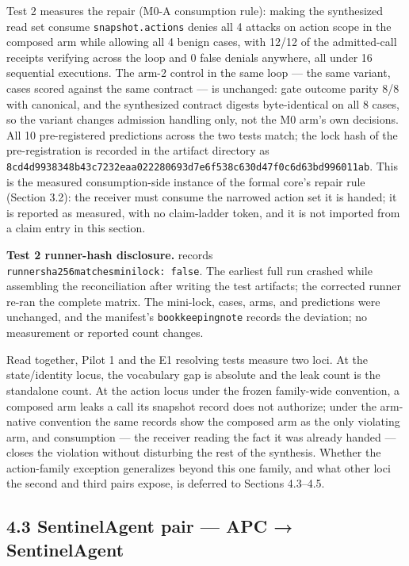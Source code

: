 \documentclass[
  10pt,
]{article}
\let\origtexttt\texttt
\renewcommand{\texttt}[1]{{\upshape\origtexttt{#1}}}
\renewcommand{\_}{\origunderscore\allowbreak}
\begin{document}
Test 2 measures the repair (M0-A consumption rule): making the
synthesized read set consume \texttt{snapshot.actions} denies all 4
attacks on action scope in the composed arm while allowing all 4 benign
cases, with 12/12 of the admitted-call receipts verifying across the
loop and 0 false denials anywhere, all under 16 sequential executions.
The arm-2 control in the same loop --- the same variant, cases scored
against the same contract --- is unchanged: gate outcome parity 8/8 with
canonical, and the synthesized contract digests byte-identical on all 8
cases, so the variant changes admission handling only, not the M0 arm's
own decisions. All 10 pre-registered predictions across the two tests
match; the lock hash of the pre-registration is recorded in the artifact
directory as
\texttt{8cd4d9938348b43c7232eaa022280693d7e6f538c630d47f0c6d63bd996011ab}.
This is the measured consumption-side instance of the formal core's
repair rule (Section 3.2): the receiver must consume the narrowed action
set it is handed; it is reported as measured, with no claim-ladder
token, and it is not imported from a claim entry in this section.

\textbf{Test 2 runner-hash disclosure.}
 records
\texttt{runner\_sha256\_matches\_mini\_lock:\ false}. The earliest full
run crashed while assembling the reconciliation after writing the test
artifacts; the corrected runner re-ran the complete matrix. The
mini-lock, cases, arms, and predictions were unchanged, and the
manifest's \texttt{bookkeeping\_note} records the deviation; no
measurement or reported count changes.

Read together, Pilot 1 and the E1 resolving tests measure two loci. At
the state/identity locus, the vocabulary gap is absolute and the leak
count is the standalone count. At the action locus under the frozen
family-wide convention, a composed arm leaks a call its snapshot record
does not authorize; under the arm-native convention the same records
show the composed arm as the only violating arm, and consumption --- the
receiver reading the fact it was already handed --- closes the violation
without disturbing the rest of the synthesis. Whether the action-family
exception generalizes beyond this one family, and what other loci the
second and third pairs expose, is deferred to Sections 4.3--4.5.

\subsection{4.3 SentinelAgent pair --- APC →
SentinelAgent}\label{sentinelagent-pair-apc-sentinelagent}
\end{document}
